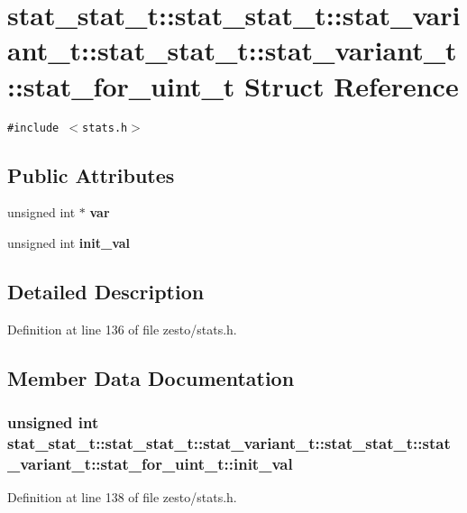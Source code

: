 \section{stat\_\-stat\_\-t::stat\_\-stat\_\-t::stat\_\-variant\_\-t::stat\_\-stat\_\-t::stat\_\-variant\_\-t::stat\_\-for\_\-uint\_\-t Struct Reference}
\label{structstat__stat__t_1_1stat__variant__t_1_1stat__for__uint__t}
{\tt \#include $<$stats.h$>$}

\subsection*{Public Attributes}
\begin{CompactItemize}
\item 
unsigned int $\ast$ {\bf var}
\item 
unsigned int {\bf init\_\-val}
\end{CompactItemize}


\subsection{Detailed Description}


Definition at line 136 of file zesto/stats.h.

\subsection{Member Data Documentation}
\subsubsection[{init\_\-val}]{\setlength{\rightskip}{0pt plus 5cm}unsigned int stat\_\-stat\_\-t::stat\_\-stat\_\-t::stat\_\-variant\_\-t::stat\_\-stat\_\-t::stat\_\-variant\_\-t::stat\_\-for\_\-uint\_\-t::init\_\-val}\label{structstat__stat__t_1_1stat__variant__t_1_1stat__for__uint__t_ce84826884ce72982fd30792d2b1fbd5}




Definition at line 138 of file zesto/stats.h.
